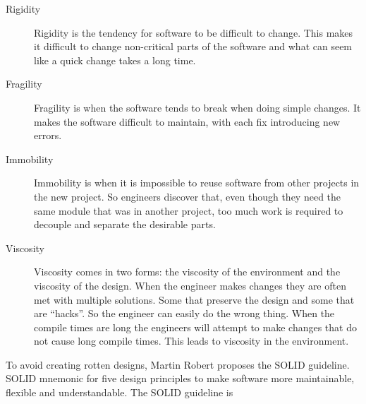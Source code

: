 \begin{description}

\item[ Rigidity ] Rigidity is the tendency for software to be difficult to
change. This makes it difficult to change non-critical parts of the software and
what can seem like a quick change takes a long time.

\item[ Fragility ] Fragility is when the software tends to break when doing
simple changes. It makes the software difficult to maintain, with each fix
introducing new errors.

\item[ Immobility ] Immobility is when it is impossible to reuse software from
other projects in the new project. So engineers discover that, even though they
need the same module that was in another project, too much work is required to
decouple and separate the desirable parts.

\item[ Viscosity ] 

Viscosity comes in two forms: the viscosity of the environment and the viscosity
of the design. When the engineer makes changes they are often met with multiple
solutions. Some that preserve the design and some that are ``hacks''. So the
engineer can easily do the wrong thing. When the compile times are long the
engineers will attempt to make changes that do not cause long compile times.
This leads to viscosity in the environment.
\end{description}

To avoid creating rotten designs, Martin Robert proposes the SOLID guideline.
SOLID mnemonic for five design principles to make software more maintainable,
flexible and understandable. The SOLID guideline is

